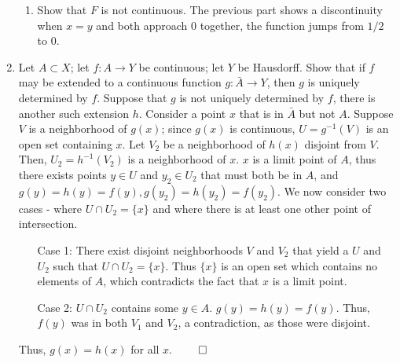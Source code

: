 \documentclass[12pt,letterpaper]{article}
\begin{document}
\begin{enumerate}
\begin{enumerate}
      \item Show that $F$ is not continuous.\hspace{5in}\n
      \indent The previous part shows a discontinuity when $x=y$ and both approach 0 together, the function jumps from $1/2$ to $0$.
    \end{enumerate}
    \item Let $A\subset X$; let $f: A\rightarrow Y$ be continuous; let $Y$ be Hausdorff. Show that if $f$ may be extended to a continuous function $g: \bar{A}\rightarrow Y$, then $g$ is uniquely determined by $f$. \hspace{5in}\n
    \indent Suppose that $g$ is not uniquely determined by $f$, there is another such extension $h$. Consider a point $x$ that is in $\bar{A}$ but not $A$. Suppose $V$ is a neighborhood of $g(x)$; since $g(x)$ is continuous, $U=g^{-1}(V)$ is an open set containing $x$. Let $V_2$ be a neighborhood of $h(x)$ disjoint from $V$. Then, $U_2=h^{-1}(V_2)$ is a neighborhood of $x$. $x$ is a limit point of $A$, thus there exists points $y\in U$ and $y_2\in U_2$ that must both be in $A$, and $g(y)=h(y)=f(y), g(y_2)=h(y_2)=f(y_2)$. %
    We now consider two cases - where $U \cap U_2 = \{x\}$ and where there is at least one other point of intersection.
    \begin{itemize}
      \item [Case 1:] There exist disjoint neighborhoods $V$ and $V_2$ that yield a $U$ and $U_2$ such that $U \cap U_2 = \{x\}$. Thus $\{x\}$ is an open set which contains no elements of $A$, which contradicts the fact that $x$ is a limit point.
      \item [Case 2:] $U \cap U_2$ contains some $y\in A$. $g(y)=h(y)=f(y)$. Thus, $f(y)$ was in both $V_1$ and $V_2$, a contradiction, as those were disjoint.
    \end{itemize}
    Thus, $g(x) = h(x)$ for all $x$.
    $\qed$
\end{enumerate}
\end{document}
